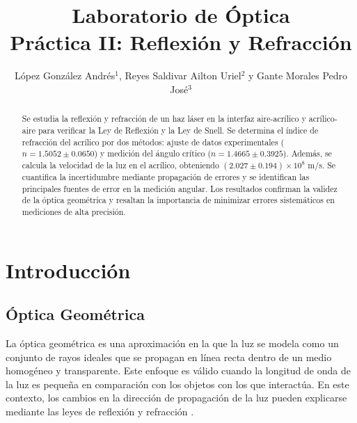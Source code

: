 \documentclass[article,12pt]{elsarticle}
\begin{document}

\begin{frontmatter}
    \title{Laboratorio de Óptica \\  Práctica  II: Reflexión y Refracción}
    \author{López González Andrés$^1$, Reyes Saldivar Ailton Uriel$^2$ y Gante Morales Pedro José$^3$} %
    \address{$^1$ Facultad de Ciencias, Universidad Nacional Autónoma de México, M\'exico CDMX.}

\begin{abstract}
Se estudia la reflexión y refracción de un haz láser en la interfaz aire-acrílico y acrílico-aire para verificar la Ley de Reflexión y la Ley de Snell. Se determina el índice de refracción del acrílico por dos métodos: ajuste de datos experimentales ($n = 1.5052 \pm 0.0650$) y medición del ángulo crítico ($n = 1.4665 \pm 0.3925$). Además, se calcula la velocidad de la luz en el acrílico, obteniendo $(2.027 \pm 0.194) \times 10^8$ m/s. Se cuantifica la incertidumbre mediante propagación de errores y se identifican las principales fuentes de error en la medición angular. Los resultados confirman la validez de la óptica geométrica y resaltan la importancia de minimizar errores sistemáticos en mediciones de alta precisión.
\end{abstract}
    
\end{frontmatter}

\vspace{0.5cm} 

\section{Introducción}

\subsection*{Óptica Geométrica}
La óptica geométrica es una aproximación en la que la luz se modela como un conjunto de rayos ideales que se propagan en línea recta dentro de un medio homogéneo y transparente. Este enfoque es válido cuando la longitud de onda de la luz es pequeña en comparación con los objetos con los que interactúa. En este contexto, los cambios en la dirección de propagación de la luz pueden explicarse mediante las leyes de reflexión y refracción \cite{Pedrotti2018}.
\end{document}
